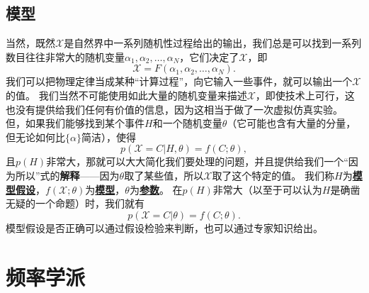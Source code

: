 \documentclass[hyperref, UTF8, a4paper]{ctexart}
\renewcommand{\emph}[1]{\textbf{#1}}
\newcommand*{\concept}[1]{\underline{\textbf{#1}}}
\begin{document}
\subsection{模型}

当然，既然$\mathcal{X}$是自然界中一系列随机性过程给出的输出，我们总是可以找到一系列数目往往非常大的随机变量$\alpha_1, \alpha_2, \ldots, \alpha_N$，它们决定了$\mathcal{X}$，即
\[
    \mathcal{X} = F(\alpha_1, \alpha_2, \ldots, \alpha_N).
\]
我们可以把物理定律当成某种“计算过程”，向它输入一些事件，就可以输出一个$\mathcal{X}$的值。
我们当然不可能使用如此大量的随机变量来描述$\mathcal{X}$，即使技术上可行，这也没有提供给我们任何有价值的信息，因为这相当于做了一次虚拟仿真实验。
但，如果我们能够找到某个事件$H$和一个随机变量$\theta$（它可能也含有大量的分量，但无论如何比$\{\alpha\}$简洁），使得
\[
    p(\mathcal{X} = C | H, \theta) = f(C ; \theta), 
\]
且$p(H)$非常大，那就可以大大简化我们要处理的问题，并且提供给我们一个“因为所以”式的\emph{解释}——因为$\theta$取了某些值，所以$\mathcal{X}$取了这个特定的值。
我们称$H$为\concept{模型假设}，$f(\mathcal{X};\theta)$为\concept{模型}，$\theta$为\concept{参数}。
在$p(H)$非常大（以至于可以认为$H$是确凿无疑的一个命题）时，我们就有
\begin{equation}
    p(\mathcal{X} = C | \theta) = f(C ; \theta).
\end{equation}
模型假设是否正确可以通过假设检验来判断，也可以通过专家知识给出。

\section{频率学派}
\end{document}
